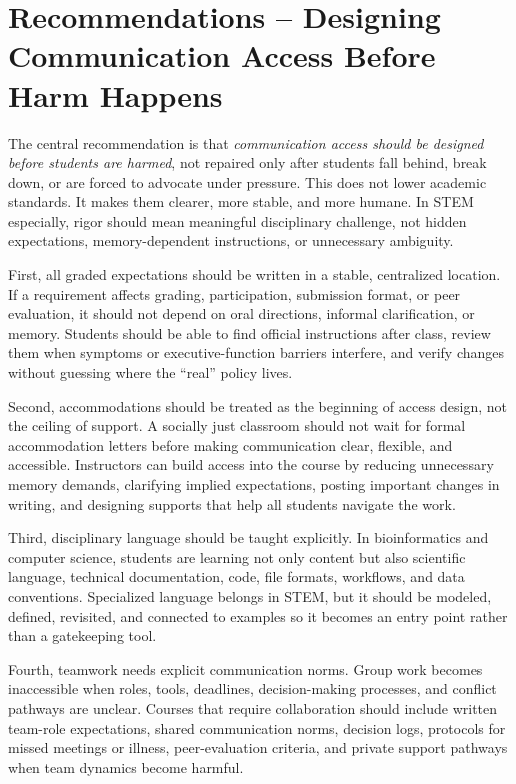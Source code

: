 \documentclass[11pt]{article}
\begin{document}
\section*{Recommendations -- Designing Communication Access Before Harm Happens}

The central recommendation is that \textit{communication access should be designed before students are harmed}, not repaired only after students fall behind, break down, or are forced to advocate under pressure. This does not lower academic standards. It makes them clearer, more stable, and more humane. In STEM especially, rigor should mean meaningful disciplinary challenge, not hidden expectations, memory-dependent instructions, or unnecessary ambiguity.

First, all graded expectations should be written in a stable, centralized location. If a requirement affects grading, participation, submission format, or peer evaluation, it should not depend on oral directions, informal clarification, or memory. Students should be able to find official instructions after class, review them when symptoms or executive-function barriers interfere, and verify changes without guessing where the “real” policy lives.

Second, accommodations should be treated as the beginning of access design, not the ceiling of support. A socially just classroom should not wait for formal accommodation letters before making communication clear, flexible, and accessible. Instructors can build access into the course by reducing unnecessary memory demands, clarifying implied expectations, posting important changes in writing, and designing supports that help all students navigate the work.

Third, disciplinary language should be taught explicitly. In bioinformatics and computer science, students are learning not only content but also scientific language, technical documentation, code, file formats, workflows, and data conventions. Specialized language belongs in STEM, but it should be modeled, defined, revisited, and connected to examples so it becomes an entry point rather than a gatekeeping tool.

Fourth, teamwork needs explicit communication norms. Group work becomes inaccessible when roles, tools, deadlines, decision-making processes, and conflict pathways are unclear. Courses that require collaboration should include written team-role expectations, shared communication norms, decision logs, protocols for missed meetings or illness, peer-evaluation criteria, and private support pathways when team dynamics become harmful.
\end{document}
